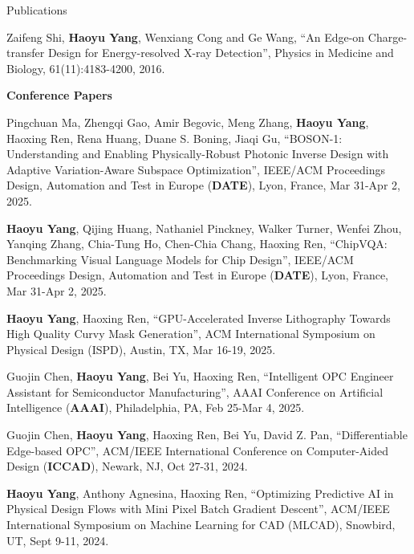 \begin{rSection}{Publications}
\begin{description}[font=\normalfont]
\item[{[J1]}]{
    Zaifeng Shi, \textbf{Haoyu Yang}, Wenxiang Cong and Ge Wang,
    ``An Edge-on Charge-transfer Design for Energy-resolved X-ray Detection'',
    Physics in Medicine and Biology, 61(11):4183-4200, 2016.
}

\end{description}

\textbf{Conference Papers}
\begin{description}[font=\normalfont]
	
	\item[{[C40]}] Pingchuan Ma, Zhengqi Gao, Amir Begovic, Meng Zhang, \textbf{Haoyu Yang}, Haoxing Ren, Rena Huang, Duane S. Boning, Jiaqi Gu, ``BOSON-1: Understanding and Enabling Physically-Robust Photonic Inverse Design with Adaptive Variation-Aware Subspace Optimization'', IEEE/ACM Proceedings Design, Automation and Test in Europe (\textbf{DATE}), Lyon, France, Mar 31-Apr 2, 2025.
	
	\item[{[C39]}] \textbf{Haoyu Yang}, Qijing Huang, Nathaniel Pinckney, Walker Turner, Wenfei Zhou, Yanqing Zhang, Chia-Tung Ho, Chen-Chia Chang, Haoxing Ren, ``ChipVQA: Benchmarking Visual Language Models for Chip Design'', IEEE/ACM Proceedings Design, Automation and Test in Europe (\textbf{DATE}), Lyon, France, Mar 31-Apr 2, 2025.
	
	\item[{[C38]}] \textbf{Haoyu Yang}, Haoxing Ren, ``GPU-Accelerated Inverse Lithography Towards High Quality Curvy Mask Generation'', ACM International Symposium on Physical Design (ISPD), Austin, TX, Mar 16-19, 2025.
	
	\item[{[C37]}] Guojin Chen, \textbf{Haoyu Yang}, Bei Yu, Haoxing Ren, ``Intelligent OPC Engineer Assistant for Semiconductor Manufacturing'', AAAI Conference on Artificial Intelligence (\textbf{AAAI}), Philadelphia, PA, Feb 25-Mar 4, 2025.
	
	\item[{[C36]}] Guojin Chen, \textbf{Haoyu Yang}, Haoxing Ren, Bei Yu, David Z. Pan, ``Differentiable Edge-based OPC'', ACM/IEEE International Conference on Computer-Aided Design (\textbf{ICCAD}), Newark, NJ, Oct 27-31, 2024.
	
	\item[{[C35]}] \textbf{Haoyu Yang}, Anthony Agnesina, Haoxing Ren, ``Optimizing Predictive AI in Physical Design Flows with Mini Pixel Batch Gradient Descent'', ACM/IEEE International Symposium on Machine Learning for CAD (MLCAD), Snowbird, UT, Sept 9-11, 2024.
	

\end{description}
\end{rSection}
